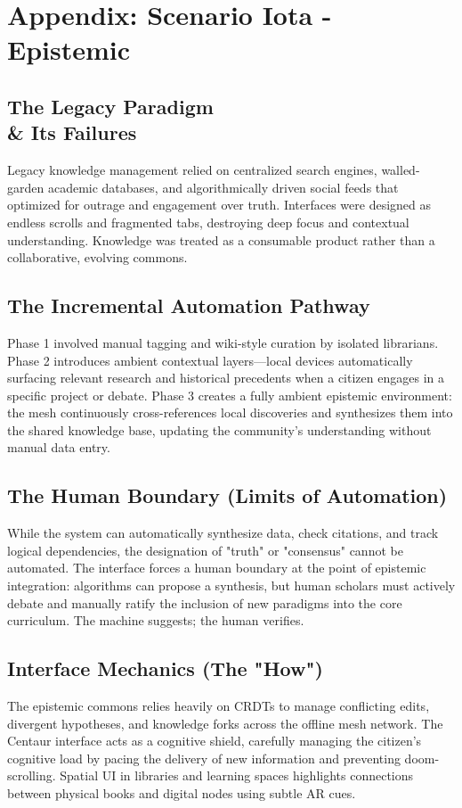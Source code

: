 \chapter{Appendix: Scenario Iota - Epistemic}

\section{The Legacy Paradigm \\\& Its Failures}
Legacy knowledge management relied on centralized search engines, walled-garden academic databases, and algorithmically driven social feeds that optimized for outrage and engagement over truth. Interfaces were designed as endless scrolls and fragmented tabs, destroying deep focus and contextual understanding. Knowledge was treated as a consumable product rather than a collaborative, evolving commons.

\section{The Incremental Automation Pathway}
Phase 1 involved manual tagging and wiki-style curation by isolated librarians. Phase 2 introduces ambient contextual layers—local devices automatically surfacing relevant research and historical precedents when a citizen engages in a specific project or debate. Phase 3 creates a fully ambient epistemic environment: the mesh continuously cross-references local discoveries and synthesizes them into the shared knowledge base, updating the community's understanding without manual data entry.

\section{The Human Boundary (Limits of Automation)}
While the system can automatically synthesize data, check citations, and track logical dependencies, the designation of "truth" or "consensus" cannot be automated. The interface forces a human boundary at the point of epistemic integration: algorithms can propose a synthesis, but human scholars must actively debate and manually ratify the inclusion of new paradigms into the core curriculum. The machine suggests; the human verifies.

\section{Interface Mechanics (The "How")}
The epistemic commons relies heavily on CRDTs to manage conflicting edits, divergent hypotheses, and knowledge forks across the offline mesh network. The Centaur interface acts as a cognitive shield, carefully managing the citizen's cognitive load by pacing the delivery of new information and preventing doom-scrolling. Spatial UI in libraries and learning spaces highlights connections between physical books and digital nodes using subtle AR cues.

